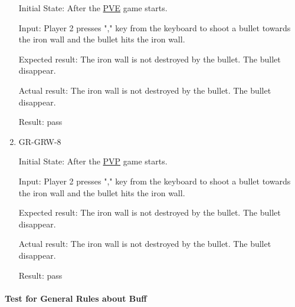 \documentclass[12pt, titlepage]{article}
\begin{document}
\begin{enumerate}
Initial State: After the \underline{PVE} game starts. 
					
Input: Player 2 presses "," key from the keyboard to shoot a bullet towards the iron wall and the bullet hits the iron wall.
					
Expected result: The iron wall is not destroyed by the bullet. The bullet disappear.
					
Actual result: The iron wall is not destroyed by the bullet. The bullet disappear.

Result: pass

\item{GR-GRW-8\\}
					
Initial State: After the \underline{PVP} game starts. 
					
Input: Player 2 presses "," key from the keyboard to shoot a bullet towards the iron wall and the bullet hits the iron wall.
					
Expected result: The iron wall is not destroyed by the bullet. The bullet disappear.
					
Actual result: The iron wall is not destroyed by the bullet. The bullet disappear.

Result: pass

\end{enumerate}

\paragraph{Test for General Rules about Buff}
\end{document}
